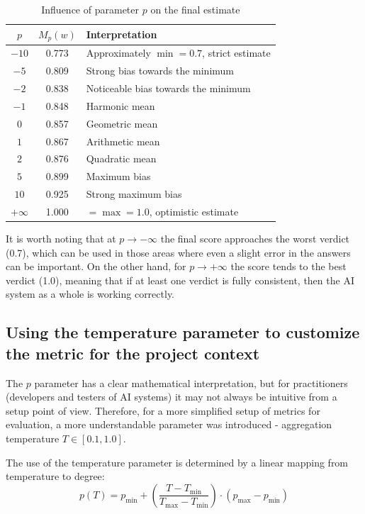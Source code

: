 \documentclass[sn-basic]{sn-jnl}
\theoremstyle{thmstyleone}%
\theoremstyle{thmstyletwo}%
\theoremstyle{thmstylethree}%
\begin{document}
\begin{table}[h]
\caption{Influence of parameter $p$ on the final estimate}
\label{tab:p-influence}
\centering
\begin{tabular}{@{}ccp{7cm}@{}}
\toprule
\textbf{$p$} & \textbf{$M_p(w)$} & \textbf{Interpretation} \\
\midrule
$-10$ & 0.773 & Approximately $\min = 0.7$, strict estimate \\ 
$-5$ & 0.809 & Strong bias towards the minimum \\ 
$-2$ & 0.838 & Noticeable bias towards the minimum \\ 
$-1$ & 0.848 & Harmonic mean \\ 
$0$ & 0.857 & Geometric mean \\ 
$1$ & 0.867 & Arithmetic mean \\ 
$2$ & 0.876 & Quadratic mean \\ 
$5$ & 0.899 & Maximum bias \\ 
$10$ & 0.925 & Strong maximum bias \\ 
$+\infty$ & 1.000 & $= \max = 1.0$, optimistic estimate \\ 
\bottomrule
\end{tabular}
\end{table}

It is worth noting that at $p \to -\infty$ the final score approaches the worst verdict (0.7), which can be used in those areas where even a slight error in the answers can be important. On the other hand, for $p \to +\infty$ the score tends to the best verdict (1.0), meaning that if at least one verdict is fully consistent, then the AI system as a whole is working correctly.

\subsection{Using the temperature parameter to customize the metric for the project context}

The $p$ parameter has a clear mathematical interpretation, but for practitioners (developers and testers of AI systems) it may not always be intuitive from a setup point of view. Therefore, for a more simplified setup of metrics for evaluation, a more understandable parameter was introduced - aggregation temperature $T \in [0.1, 1.0]$.

The use of the temperature parameter is determined by a linear mapping from temperature to degree:
\begin{equation}
\label{eq:temp-mapping}
p(T) = p_{\min} + \left( \frac{T - T_{\min}}{T_{\max} - T_{\min}} \right) \cdot (p_{\max} - p_{\min})
\end{equation}
\end{document}
